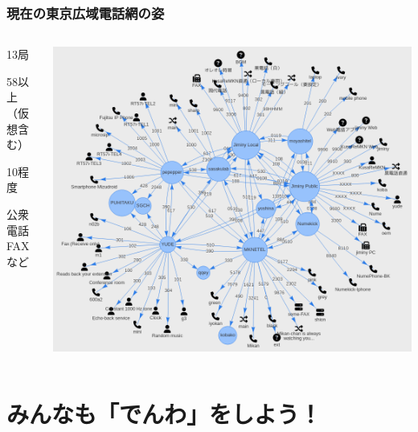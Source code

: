 \documentclass[
  lualatex,
  aspectratio=169,
  14pt
]{beamer}
\begin{document}
\begin{frame}
  \frametitle{現在の東京広域電話網の姿}

  \begin{columns}
    \begin{column}{.25\textwidth}
      \begin{description}[labelwidth=\linewidth]
        \item[交換局数]
          13局
        \item[端末数]
          58以上\\
          （仮想含む）
        \item[うち黒電話]
          10程度
        \item[その他]
          公衆電話\\
          FAXなど
      \end{description}
    \end{column}
    \begin{column}{.7\textwidth}
      \centering
      \includegraphics[height=.87\textheight]{./images/mantela.png}
    \end{column}
  \end{columns}
\end{frame}

\section{みんなも「でんわ」をしよう！}
\end{document}
